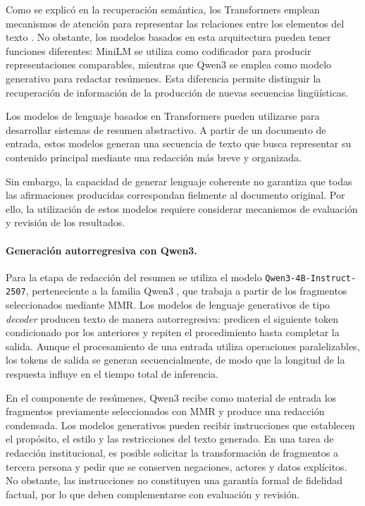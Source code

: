 Como se explicó en la recuperación semántica, los Transformers emplean mecanismos de atención para representar las relaciones entre los elementos del texto \cite{vaswani2017attention}. No obstante, los modelos basados en esta arquitectura pueden tener funciones diferentes: MiniLM se utiliza como codificador para producir representaciones comparables, mientras que Qwen3 se emplea como modelo generativo para redactar resúmenes. Esta diferencia permite distinguir la recuperación de información de la producción de nuevas secuencias lingüísticas.

Los modelos de lenguaje basados en Transformers pueden utilizarse para desarrollar sistemas de resumen abstractivo. A partir de un documento de entrada, estos modelos generan una secuencia de texto que busca representar su contenido principal mediante una redacción más breve y organizada.

Sin embargo, la capacidad de generar lenguaje coherente no garantiza que todas las afirmaciones producidas correspondan fielmente al documento original. Por ello, la utilización de estos modelos requiere considerar mecanismos de evaluación y revisión de los resultados.

\paragraph{Generación autorregresiva con Qwen3.}

Para la etapa de redacción del resumen se utiliza el modelo \texttt{Qwen3-4B-Instruct-2507}, perteneciente a la familia Qwen3 \cite{hf_qwen3_4b_instruct_2507}, que trabaja a partir de los fragmentos seleccionados mediante MMR. Los modelos de lenguaje generativos de tipo \textit{decoder} producen texto de manera autorregresiva: predicen el siguiente token condicionado por los anteriores y repiten el procedimiento hasta completar la salida. Aunque el procesamiento de una entrada utiliza operaciones paralelizables, los tokens de salida se generan secuencialmente, de modo que la longitud de la respuesta influye en el tiempo total de inferencia.

En el componente de resúmenes, Qwen3 recibe como material de entrada los fragmentos previamente seleccionados con MMR y produce una redacción condensada. Los modelos generativos pueden recibir instrucciones que establecen el propósito, el estilo y las restricciones del texto generado. En una tarea de redacción institucional, es posible solicitar la transformación de fragmentos a tercera persona y pedir que se conserven negaciones, actores y datos explícitos. No obstante, las instrucciones no constituyen una garantía formal de fidelidad factual, por lo que deben complementarse con evaluación y revisión.

